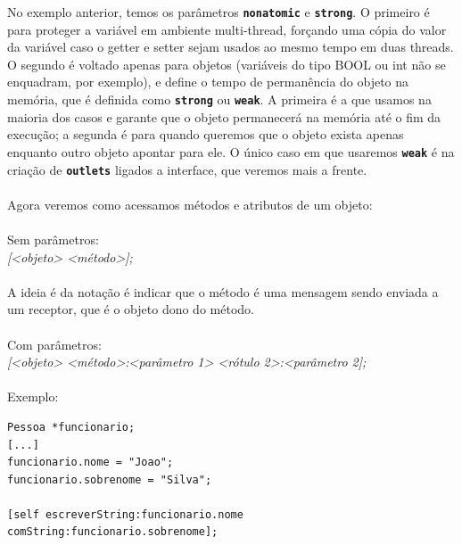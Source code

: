 \documentclass[a4paper,12pt,brazil,doubleside]{book}
\begin{document}
No exemplo anterior, temos os parâmetros \texttt{\textbf{nonatomic}} e \texttt{\textbf{strong}}. O primeiro é para proteger a variável em ambiente multi-thread, forçando uma cópia do valor da variável caso o getter e setter sejam usados ao mesmo tempo em duas threads. O segundo é voltado apenas para objetos (variáveis do tipo BOOL ou int não se enquadram, por exemplo), e define o tempo de permanência do objeto na memória, que é definida como \texttt{\textbf{strong}} ou \texttt{\textbf{weak}}. A primeira é a que usamos na maioria dos casos e garante que o objeto permanecerá na memória até o fim da execução; a segunda é para quando queremos que o objeto exista apenas enquanto outro objeto apontar para ele. O único caso em que usaremos \texttt{\textbf{weak}} é na criação de \texttt{\textbf{outlets}} ligados a interface, que veremos mais a frente.

\paragraph{}Agora veremos como acessamos métodos e atributos de um objeto:

\paragraph{}Sem parâmetros:\\
\emph{[<objeto> <método>];}

\paragraph{}A ideia é da notação é indicar que o método é uma mensagem sendo enviada a um receptor, que é o objeto dono do método.

\paragraph{}Com parâmetros:\\
\emph{[<objeto> <método>:<parâmetro 1> <rótulo 2>:<parâmetro 2];}

\pagebreak

\paragraph{}Exemplo:

\begin{listing}
\begin{verbatim}
Pessoa *funcionario;
[...]
funcionario.nome = "Joao";
funcionario.sobrenome = "Silva";

[self escreverString:funcionario.nome comString:funcionario.sobrenome];
\end{verbatim}
\end{listing}
\end{document}
